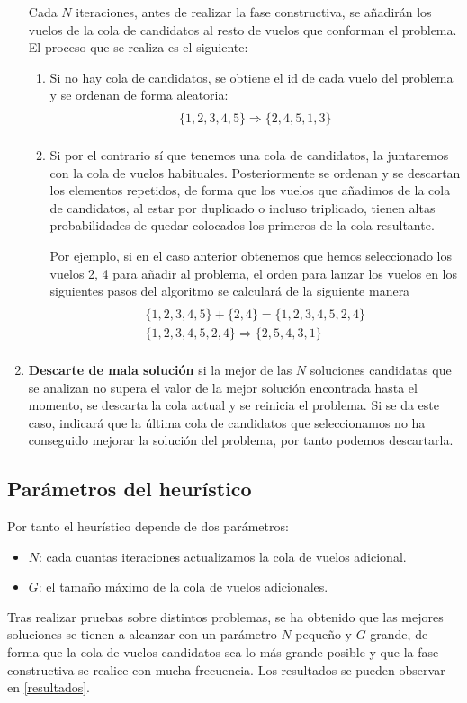 \begin{enumerate}
		Cada $N$ iteraciones, antes de realizar la fase constructiva, se añadirán los vuelos de la cola de candidatos al resto de vuelos que conforman el problema. El proceso que se realiza es el siguiente:
	\begin{enumerate}
		\item Si no hay cola de candidatos, se obtiene el id de cada vuelo del problema y se ordenan de forma aleatoria:
		\begin{multline}\\
		\{1,2,3,4,5\} \Rightarrow \{2,4,5,1,3\}\\
		\end{multline}
		\item Si por el contrario sí que tenemos una cola de candidatos, la juntaremos con la cola de vuelos habituales. Posteriormente se ordenan y se descartan los elementos repetidos, de forma que los vuelos que añadimos de la cola de candidatos, al estar por duplicado o incluso triplicado, tienen altas probabilidades de quedar colocados los primeros de la cola resultante.
		
		Por ejemplo, si en el caso anterior obtenemos que hemos seleccionado los vuelos 2, 4 para añadir al problema, el orden para lanzar los vuelos en los siguientes pasos del algoritmo se calculará de la siguiente manera
		\begin{multline}\\
		\{1,2,3,4,5\} + \{2,4\} = \{1,2,3,4,5,2,4\} \\
		\{1,2,3,4,5,2,4\} \Rightarrow \{2,5,4,3,1\}  \\ 
		\end{multline}
	\end{enumerate}
	
	\item \textbf{Descarte de mala solución} si la mejor de las $N$ soluciones candidatas que se analizan no supera el valor de la mejor solución encontrada hasta el momento, se descarta la cola actual y se reinicia el problema.
	Si se da este caso, indicará que la última cola de candidatos que seleccionamos no ha conseguido mejorar la solución del problema, por tanto podemos descartarla.
\end{enumerate}


\subsection{Parámetros del heurístico}
Por tanto el heurístico depende de dos parámetros:
\begin{itemize}
	\item \textbf{$N$}: cada cuantas iteraciones actualizamos la cola de vuelos adicional.
	\item \textbf{$G$}: el tamaño máximo de la cola de vuelos adicionales.
\end{itemize}
Tras realizar pruebas sobre distintos problemas, se ha obtenido que las mejores soluciones se tienen a alcanzar con un parámetro $N$ pequeño y $G$ grande, de forma que la cola de vuelos candidatos sea lo más grande posible y que la fase constructiva se realice con mucha frecuencia. Los resultados se pueden observar en \autoref{resultados}.

